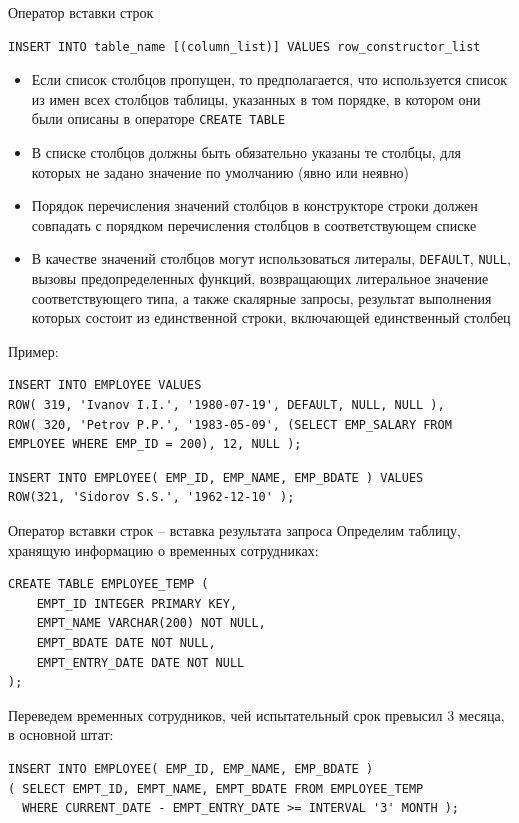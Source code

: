\documentclass[a4paper,12pt]{article}
\begin{document}
Оператор вставки строк  
\begin{lstlisting}
INSERT INTO table_name [(column_list)] VALUES row_constructor_list
\end{lstlisting}

\begin{itemize}
    \item Если список столбцов пропущен, то предполагается, что используется список из имен всех столбцов таблицы, указанных в том порядке, в котором они были описаны в операторе \texttt{CREATE TABLE}
    \item В списке столбцов должны быть обязательно указаны те столбцы, для которых не задано значение по умолчанию (явно или неявно)
    \item Порядок перечисления значений столбцов в конструкторе строки должен совпадать с порядком перечисления столбцов в соответствующем списке
    \item В качестве значений столбцов могут использоваться литералы, \texttt{DEFAULT}, \texttt{NULL}, вызовы предопределенных функций, возвращающих литеральное значение соответствующего типа, а также скалярные запросы, результат выполнения которых состоит из единственной строки, включающей единственный столбец
\end{itemize}

Пример:
\begin{lstlisting}
INSERT INTO EMPLOYEE VALUES  
ROW( 319, 'Ivanov I.I.', '1980-07-19', DEFAULT, NULL, NULL ),  
ROW( 320, 'Petrov P.P.', '1983-05-09', (SELECT EMP_SALARY FROM EMPLOYEE WHERE EMP_ID = 200), 12, NULL );
\end{lstlisting}


\begin{lstlisting}
INSERT INTO EMPLOYEE( EMP_ID, EMP_NAME, EMP_BDATE ) VALUES  
ROW(321, 'Sidorov S.S.', '1962-12-10' );
\end{lstlisting}

Оператор вставки строк – вставка результата запроса  
Определим таблицу, хранящую информацию о временных сотрудниках:
\begin{lstlisting}
CREATE TABLE EMPLOYEE_TEMP (
    EMPT_ID INTEGER PRIMARY KEY,
    EMPT_NAME VARCHAR(200) NOT NULL,
    EMPT_BDATE DATE NOT NULL,
    EMPT_ENTRY_DATE DATE NOT NULL
);
\end{lstlisting}

Переведем временных сотрудников, чей испытательный срок превысил 3 месяца, в основной штат:
\begin{lstlisting}
INSERT INTO EMPLOYEE( EMP_ID, EMP_NAME, EMP_BDATE )
( SELECT EMPT_ID, EMPT_NAME, EMPT_BDATE FROM EMPLOYEE_TEMP
  WHERE CURRENT_DATE - EMPT_ENTRY_DATE >= INTERVAL '3' MONTH );
\end{lstlisting}
\end{document}
